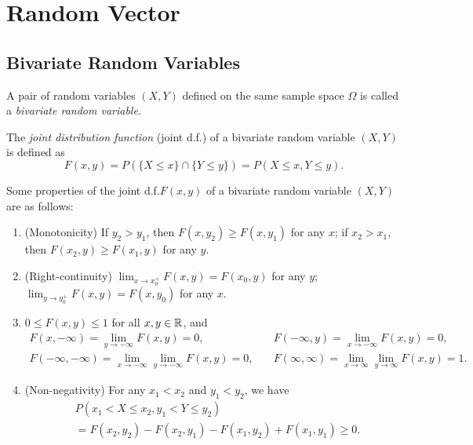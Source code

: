 \chapter{Random Vector}

\section{Bivariate Random Variables}

\begin{definition}
  A pair of random variables \((X, Y)\) defined on the same sample space \(\Omega\) is called a \emph{bivariate random variable}.
\end{definition}

\begin{definition}
  The \emph{joint distribution function} (joint d.f.\@) of a bivariate random variable \((X, Y)\) is defined as
  \[
    F(x, y) = P\!\left(\{X \leq x\} \cap \{Y \leq y\}\right) = P(X \leq x, Y \leq y).
  \]
\end{definition}

\begin{proposition}
  Some properties of the joint d.f.\@ \(F(x, y)\) of a bivariate random variable \((X, Y)\) are as follows:
  \begin{enumerate}
    \item (Monotonicity) If \(y_2 > y_1\), then \(F(x, y_2) \geq F(x, y_1)\) for any \(x\); if \(x_2 > x_1\), then \(F(x_2, y) \geq F(x_1, y)\) for any \(y\).
    \item (Right-continuity) \(\lim_{x \to x_0^+} F(x, y) = F(x_0, y)\) for any \(y\); \(\lim_{y \to y_0^+} F(x, y) = F(x, y_0)\) for any \(x\).
    \item \(0 \leq F(x, y) \leq 1\) for all \(x, y \in \mathbb{R}\), and
    \begin{align*}
      F(x, -\infty) = \lim_{y \to -\infty} F(x, y) = 0, &\quad F(-\infty, y) = \lim_{x \to -\infty} F(x, y) = 0, \\
      F(-\infty, -\infty) = \lim_{x \to -\infty} \lim_{y \to -\infty} F(x, y) = 0, &\quad F(\infty, \infty) = \lim_{x \to \infty} \lim_{y \to \infty} F(x, y) = 1.
    \end{align*}
    \item (Non-negativity) For any \(x_1 < x_2\) and \(y_1 < y_2\), we have
    \begin{align*}
      &P(x_1 < X \leq x_2, y_1 < Y \leq y_2) \\
      &= F(x_2, y_2) - F(x_2, y_1) - F(x_1, y_2) + F(x_1, y_1) \geq 0.
    \end{align*}
  \end{enumerate}
\end{proposition}

